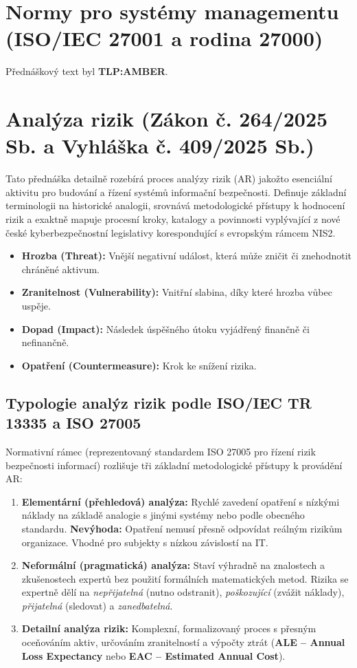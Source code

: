 \documentclass[10pt,a4paper]{article}
\begin{document}
	
	\section{Normy pro systémy managementu (ISO/IEC 27001 a rodina 27000)}
	
	Přednáškový text byl \textbf{TLP:AMBER}.
	
	\section{Analýza rizik (Zákon č. 264/2025 Sb. a Vyhláška č. 409/2025 Sb.)}
	
	Tato přednáška detailně rozebírá proces analýzy rizik (AR) jakožto esenciální aktivitu pro budování a řízení systémů informační bezpečnosti. Definuje základní terminologii na historické analogii, srovnává metodologické přístupy k hodnocení rizik a exaktně mapuje procesní kroky, katalogy a povinnosti vyplývající z nové české kyberbezpečnostní legislativy korespondující s evropským rámcem NIS2.
	
	\begin{itemize}
		\item \textbf{Hrozba (Threat):} Vnější negativní událost, která může zničit či znehodnotit chráněné aktivum.
		\item \textbf{Zranitelnost (Vulnerability):} Vnitřní slabina, díky které hrozba vůbec uspěje. 
		\item \textbf{Dopad (Impact):} Následek úspěšného útoku vyjádřený finančně či nefinančně.
		\item \textbf{Opatření (Countermeasure):} Krok ke snížení rizika.
	\end{itemize}
	
	\subsection{Typologie analýz rizik podle ISO/IEC TR 13335 a ISO 27005}
	Normativní rámec (reprezentovaný standardem ISO 27005 pro řízení rizik bezpečnosti informací) rozlišuje tři základní metodologické přístupy k provádění AR:
	\begin{enumerate}
		\item \textbf{Elementární (přehledová) analýza:} Rychlé zavedení opatření s nízkými náklady na základě analogie s jinými systémy nebo podle obecného standardu. \textbf{Nevýhoda:} Opatření nemusí přesně odpovídat reálným rizikům organizace. Vhodné pro subjekty s nízkou závislostí na IT.
		
		\item \textbf{Neformální (pragmatická) analýza:} Staví výhradně na znalostech a zkušenostech expertů bez použití formálních matematických metod. Rizika se expertně dělí na \textit{nepřijatelná} (nutno odstranit), \textit{poškozující} (zvážit náklady), \textit{přijatelná} (sledovat) a \textit{zanedbatelná}.
		
		\item \textbf{Detailní analýza rizik:} Komplexní, formalizovaný proces s přesným oceňováním aktiv, určováním zranitelností a výpočty ztrát (\textbf{ALE -- Annual Loss Expectancy} nebo \textbf{EAC -- Estimated Annual Cost}).
	\end{enumerate}
	
\end{document}
